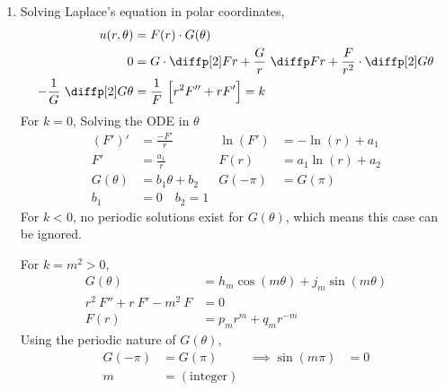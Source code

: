 \begin{enumerate}
\begin{enumerate}
              \item Solving Laplace's equation in polar coordinates,
                    \begin{align}
                        u(r, \theta)                    & = F(r) \cdot G(\theta)      \\
                        0                               & = G \cdot \diffp[2] Fr
                        + \frac{G}{r}\ \diffp Fr
                        + \frac{F}{r^2} \cdot \diffp[2] G\theta                       \\
                        -\frac{1}{G}\ \diffp[2] G\theta & = \frac{1}{F}\ \Big[ r^2F''
                            + rF' \Big] = k
                    \end{align}
                    For $ k = 0 $, Solving the ODE in $ \theta $
                    \begin{align}
                        (F')'     & = \frac{-F'}{r}    & \ln(F') & = -\ln(r) + a_1   \\
                        F'        & = \frac{a_1}{r}    & F(r)    & = a_1\ln(r) + a_2 \\
                        G(\theta) & = b_1 \theta + b_2 & G(-\pi) & = G(\pi)          \\
                        b_1       & = 0 \quad b_2 = 1
                    \end{align}
                    For $ k < 0 $, no periodic solutions exist for $ G(\theta) $, which
                    means this case can be ignored. \par
                    For $ k = m^2 > 0 $,
                    \begin{align}
                        G(\theta)                 & = h_m\cos(m \theta)
                        + j_m\sin(m\theta)                                 \\
                        r^2\ F'' + r\ F' - m^2\ F & = 0                    \\
                        F(r)                      & = p_m r^m + q_m r^{-m}
                    \end{align}
                    Using the periodic nature of $ G(\theta) $,
                    \begin{align}
                        G(-\pi)             & = G(\pi)           &
                        \implies \sin(m\pi) & = 0                  \\
                        m                   & = (\text{integer})
                    \end{align}

\end{enumerate}
\end{enumerate}
